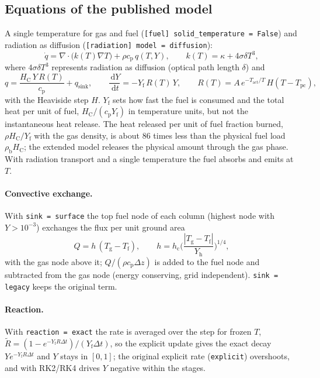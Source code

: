 \documentclass[11pt,a4paper]{article}
\newcommand{\dd}{\,\mathrm{d}}
\newcommand{\code}[1]{\texttt{#1}}
\begin{document}
\subsection{Equations of the published model}\label{app:published}
A single temperature for gas and fuel (\code{[fuel] solid\_temperature = False}) and radiation as
diffusion (\code{[radiation] model = diffusion}):
\begin{equation}
  \dot q = \nabla\cdot\big(k(T)\nabla T\big) + \rho c_\text{p}\,q(T,Y),\qquad k(T)=\kappa+4\sigma\delta T^3,
\end{equation}
where $4\sigma\delta T^3$ represents radiation as diffusion (optical path length $\delta$) and
\begin{equation}
  q = \frac{H_\text{C}\,Y\,R(T)}{c_\text{p}} + q_\text{sink},\qquad
  \frac{\dd Y}{\dd t} = -Y_\text{f}\,R(T)\,Y,\qquad R(T)=A\,e^{-T_\text{act}/T}\,H(T-T_\text{pc}),
\end{equation}
with the Heaviside step $H$. $Y_\text{f}$ sets how fast the fuel is consumed and the total heat per unit
of fuel, $H_\text{C}/(c_\text{p}Y_\text{f})$ in temperature units, but not the instantaneous heat release. The heat
released per unit of fuel fraction burned, $\rho H_\text{C}/Y_\text{f}$ with the gas density, is about 86 times less
than the physical fuel load $\rho_\text{b}H_\text{C}$; the extended model releases the physical amount through the
gas phase. With radiation transport and a single temperature the fuel absorbs and emits at $T$.

\paragraph{Convective exchange.} With \code{sink = surface} the top fuel node of each column (highest
node with $Y>10^{-3}$) exchanges the flux per unit ground area
\begin{equation}
  Q = h\,(T_\text{g}-T_\text{f}),\qquad h=h_\text{c}\Big(\frac{|T_\text{g}-T_\text{f}|}{Y_\text{h}}\Big)^{1/4},
\end{equation}
with the gas node above it; $Q/(\rho c_\text{p}\Delta z)$ is added to the fuel node and subtracted from
the gas node (energy conserving, grid independent). \code{sink = legacy} keeps the original term.

\paragraph{Reaction.} With \code{reaction = exact} the rate is averaged over the step for frozen $T$,
$\tilde R = (1-e^{-Y_\text{f}R\Delta t})/(Y_\text{f}\Delta t)$, so the explicit update gives the exact decay
$Y e^{-Y_\text{f}R\Delta t}$ and $Y$ stays in $[0,1]$; the original explicit rate (\code{explicit})
overshoots, and with RK2/RK4 drives $Y$ negative within the stages.
\end{document}

